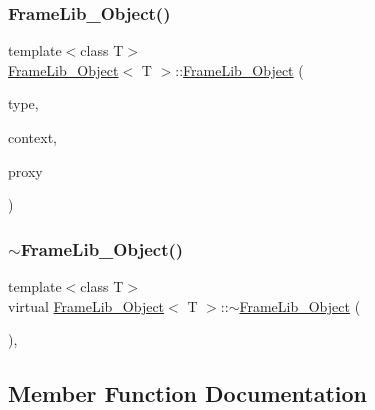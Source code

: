 \subsubsection{\texorpdfstring{Frame\+Lib\+\_\+\+Object()}{FrameLib\_Object()}}
{\footnotesize\ttfamily template$<$class T$>$ \\
\hyperlink{class_frame_lib___object}{Frame\+Lib\+\_\+\+Object}$<$ T $>$\+::\hyperlink{class_frame_lib___object}{Frame\+Lib\+\_\+\+Object} (\begin{DoxyParamCaption}\item[{\hyperlink{_frame_lib___types_8h_a842c5e2e69277690b064bf363c017980}{Object\+Type}}]{type,  }\item[{\hyperlink{class_frame_lib___context}{Frame\+Lib\+\_\+\+Context}}]{context,  }\item[{\hyperlink{struct_frame_lib___proxy}{Frame\+Lib\+\_\+\+Proxy} $\ast$}]{proxy }\end{DoxyParamCaption})\hspace{0.3cm}{\ttfamily [inline]}}

\mbox{\label{class_frame_lib___object_ab88bcc3fe9e1c9da41a4afebb3d05005}} 
\subsubsection{\texorpdfstring{$\sim$\+Frame\+Lib\+\_\+\+Object()}{~FrameLib\_Object()}}
{\footnotesize\ttfamily template$<$class T$>$ \\
virtual \hyperlink{class_frame_lib___object}{Frame\+Lib\+\_\+\+Object}$<$ T $>$\+::$\sim$\hyperlink{class_frame_lib___object}{Frame\+Lib\+\_\+\+Object} (\begin{DoxyParamCaption}{ }\end{DoxyParamCaption})\hspace{0.3cm}{\ttfamily [inline]}, {\ttfamily [virtual]}}



\subsection{Member Function Documentation}
\mbox{\label{class_frame_lib___object_a53722775485e80ba9590750ad68e437b}} 
